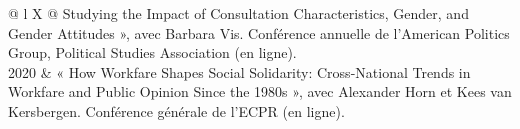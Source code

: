 \documentclass[letterpaper,fontsize=10.5pt]{scrartcl}
\begin{document}
\begin{longtblr}[entry=none,label=none]{@{} l X @{}}
	Studying the Impact of Consultation Characteristics, Gender, and Gender Attitudes », avec Barbara Vis. Conférence annuelle de l'American Politics Group, Political Studies Association (en ligne).\\		
	2020 & « How Workfare Shapes Social Solidarity: Cross-National Trends in Workfare and Public Opinion Since the 1980s », avec Alexander Horn et Kees van Kersbergen. Conférence générale de l'ECPR (en ligne).\\

\end{longtblr}
\end{document}
